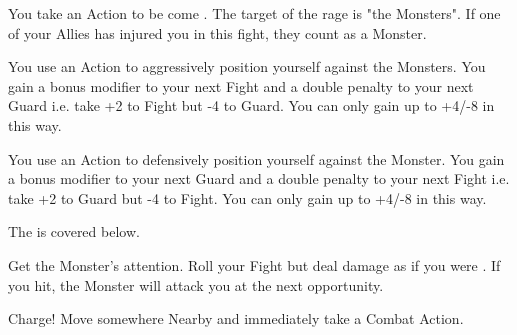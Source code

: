 {  
  You take an Action to be come .  The target of the rage is "the Monsters". If one of your Allies has injured you in this fight, they count as a Monster.

  You use an Action to aggressively position yourself against the Monsters.  You gain a bonus modifier to your next Fight \RO and a double penalty to your next Guard \RO i.e. take +2 to Fight but -4 to Guard.  You can only gain up to +4/-8 in this way.


  You use an Action to defensively position yourself against the Monster.  You gain a bonus modifier to your next Guard \RO and a double penalty to your next Fight \RO i.e. take +2 to Guard but -4 to Fight. You can only gain up to +4/-8 in this way.



  The  is covered below.




  Get the Monster's attention.  Roll your Fight \RO but deal damage as if you were .   If you hit, the Monster will attack you at the next opportunity.


  Charge!  Move somewhere Nearby and immediately take a Combat Action.


}
